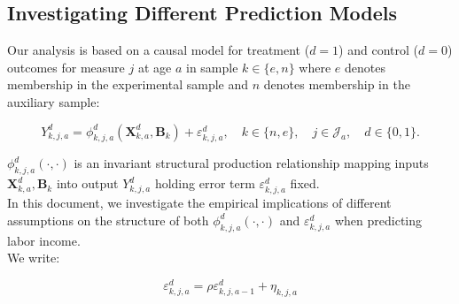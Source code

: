


\usepackage[stable]{footmisc}

\newcommand*\leftright[2]{%
  \leavevmode
  \rlap{#1}%
  \hspace{0.5\linewidth}%
  #2}

\newcommand{\orth}{\ensuremath{\perp\!\!\!\perp}}%
\newcommand{\indep}{\orth}%
\newcommand{\notorth}{\ensuremath{\perp\!\!\!\!\!\!\diagup\!\!\!\!\!\!\perp}}%
\newcommand{\notindep}{\notorth}







\doublespacing

\subsection{Investigating Different Prediction Models} \label{appendix:predmodels}

\noindent Our analysis is based on a causal model for treatment ($d=1$) and control ($d=0$) outcomes for measure $j$ at age $a$ in sample $k \in \{e,n\}$ where $e$ denotes membership in the experimental sample and $n$ denotes membership in the auxiliary sample:

\begin{equation}\label{eq:outcome}
Y^d_{k,j,a} = \phi^d_{k,j,a} (\bm{X}^d_{k,a}, \bm{B}_k) + \varepsilon^d_{k,j,a}, \quad k \in \{n,e\}, \quad j \in \mathcal{J}_a, \quad d \in \{0, 1\}.
\end{equation}

\noindent $\phi^d_{k,j,a}\left( \cdot, \cdot \right)$ is an invariant structural production relationship mapping inputs $\bm{X}^d_{k,a}, \bm{B}_k$ into output $Y^d_{k,j,a}$ holding error term $\varepsilon^d_{k,j,a}$ fixed.\\ 

\noindent In this document, we investigate the empirical implications of different assumptions on the structure of both $\phi_{k,j,a}^d \left( \cdot, \cdot \right)$ and $\varepsilon_{k,j,a}^d$ when predicting labor income.\\ 

\noindent We write: 

\begin{equation}
\varepsilon^d_{k,j,a} = \rho \varepsilon^d_{k,j,{a-1}} + \eta_{k,j,{a}} \label{eq:error}
\end{equation}


